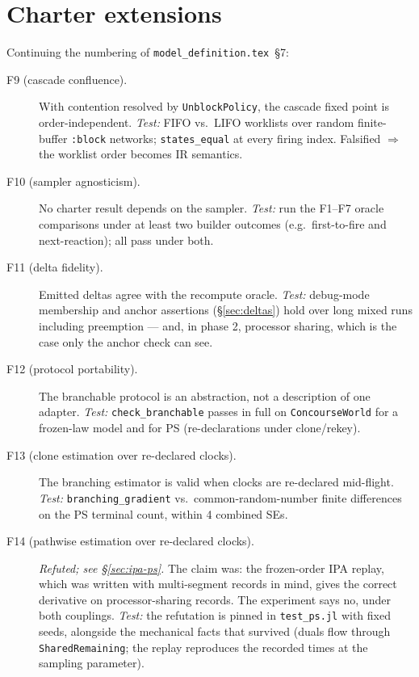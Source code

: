 \documentclass[11pt]{article}
\newcommand{\code}[1]{\texttt{#1}}
\begin{document}
\section{Charter extensions}
\label{sec:charter}

Continuing the numbering of \code{model\_definition.tex}~\S7:

\begin{description}
\item[F9 (cascade confluence).] With contention resolved by
  \code{UnblockPolicy}, the cascade fixed point is order-independent.
  \emph{Test:} FIFO vs.\ LIFO worklists over random finite-buffer
  \code{:block} networks; \code{states\_equal} at every firing index.
  Falsified $\Rightarrow$ the worklist order becomes IR semantics.
\item[F10 (sampler agnosticism).] No charter result depends on the sampler.
  \emph{Test:} run the F1--F7 oracle comparisons under at least two builder
  outcomes (e.g.\ first-to-fire and next-reaction); all pass under both.
\item[F11 (delta fidelity).] Emitted deltas agree with the recompute
  oracle. \emph{Test:} debug-mode membership and anchor assertions
  (\S\ref{sec:deltas}) hold over long mixed runs including preemption ---
  and, in phase 2, processor sharing, which is the case only the anchor
  check can see.
\item[F12 (protocol portability).] The branchable protocol is an
  abstraction, not a description of one adapter. \emph{Test:}
  \code{check\_branchable} passes in full on \code{ConcourseWorld} for a
  frozen-law model and for PS (re-declarations under clone/rekey).
\item[F13 (clone estimation over re-declared clocks).] The branching
  estimator is valid when clocks are re-declared mid-flight.
  \emph{Test:} \code{branching\_gradient} vs.\ common-random-number finite
  differences on the PS terminal count, within 4 combined SEs.
\item[F14 (pathwise estimation over re-declared clocks).] \emph{Refuted;
  see \S\ref{sec:ipa-ps}.} The claim was: the frozen-order IPA replay,
  which was written with multi-segment records in mind, gives the correct
  derivative on processor-sharing records. The experiment says no, under
  both couplings. \emph{Test:} the refutation is pinned in
  \code{test\_ps.jl} with fixed seeds, alongside the mechanical facts that
  survived (duals flow through \code{SharedRemaining}; the replay
  reproduces the recorded times at the sampling parameter).
\end{description}
\end{document}
